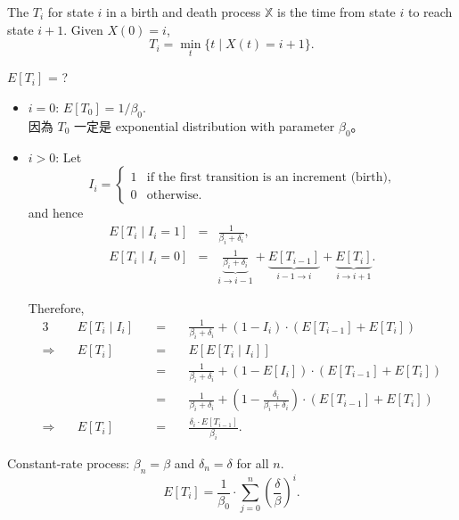 \begin{definition}
The  $ T_{i} $ for state $ i $ in a birth and death process $ \mathbb{X} $ is the time from state $ i $ to reach state $ i + 1 $. Given $ X(0) = i $,
\[ T_{i} = \min_{t} \{ t \mid X(t) = i + 1 \}. \]
\end{definition}

\begin{question}
$ E[T_{i}] $ = ?

\begin{itemize}
\item $ i = 0 $: $ E[T_{0}] = 1 / \beta_{0} $. \\
  因為 $ T_{0} $ 一定是 exponential distribution with parameter $ \beta_{0} $。

\item $ i > 0 $: Let
\[ I_{i} = \begin{cases}
1 & \text{if the first transition is an increment (birth),} \\
0 & \text{otherwise.}
\end{cases} \]
and hence
\begin{eqnarray*}
E[T_{i} \mid I_{i} = 1] & = & \frac{1}{\beta_{i} + \delta_{i}}, \\
E[T_{i} \mid I_{i} = 0] & = & \underbrace{\frac{1}{\beta_{i} + \delta_{i}}}_{i \to i - 1} + \underbrace{E[T_{i - 1}]}_{i - 1 \to i} + \underbrace{E[T_{i}]}_{i \to i + 1}.
\end{eqnarray*}

Therefore,
\begin{alignat*}{3}
  & E[T_{i} \mid I_{i}]
    & \quad=\quad & \frac{1}{\beta_{i} + \delta_{i}} + (1 - I_{i}) \cdot (E[T_{i - 1}] + E[T_{i}]) \\
\Rightarrow\quad
  & E[T_{i}]
    & \quad=\quad & E[E[T_{i} \mid I_{i}]] \\
  & & \quad=\quad & \frac{1}{\beta_{i} + \delta_{i}} + (1 - E[I_{i}]) \cdot (E[T_{i - 1}] + E[T_{i}]) \\
  & & \quad=\quad & \frac{1}{\beta_{i} + \delta_{i}} + \left( 1 - \frac{\delta_{i}}{\beta_{i} + \delta_{i}} \right) \cdot (E[T_{i - 1}] + E[T_{i}]) \\
\Rightarrow\quad
  & E[T_{i}]
    & \quad=\quad & \frac{\delta_{i} \cdot E[T_{i - 1}]}{\beta_{i}}.
\end{alignat*}
\end{itemize}
\end{question}

\begin{example}
Constant-rate process: $ \beta_{n} = \beta $ and $ \delta_{n} = \delta $ for all $ n $.
\[ E[T_{i}] = \frac{1}{\beta_{0}} \cdot \sum_{j = 0}^{n} \left( \frac{\delta}{\beta} \right)^{i}. \]
\end{example}
